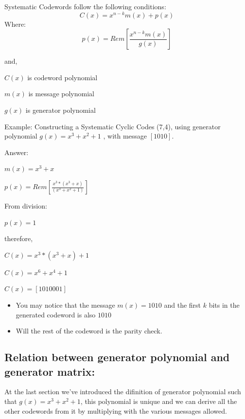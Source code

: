 \documentclass[a4paper,12pt]{report}
\begin{document}
{        Systematic Codewords follow the following conditions:
        \begin{equation*}
            C(x) = x^{n-k} m(x) + p(x)
        \end{equation*}
        Where:
        \begin{equation*}
            p(x) = Rem \left[ \frac{x^{n-k} m(x)}{g(x)} \right]
        \end{equation*}

        and,

        $C(x)$ is codeword polynomial
        
        $m(x)$ is message polynomial
        
        $g(x)$ is generator polynomial

        \vspace{0.5cm}
        Example: Constructing a Systematic Cyclic Codes (7,4), using generator polynomial
        $g(x) = x^3 + x^2 +1$ , with message $[1 0 1 0]$.
        \vspace{0.5cm}
        
        Answer:

        $m(x) = x^3 + x$
        
        $p(x) = Rem \left[ \frac{ x^{3} *\left(x^3 + x\right) }{\left( x^3 + x^2 +1\right)} \right]$

        From division:

        $p(x) = 1$

        therefore,

        $C(x) = x^3 * \left(x^3 + x\right) + 1$
        
        $C(x) = x^6 + x^4 + 1$
        
        $C(x) = \left[1010001\right]$
        
    {\renewcommand\labelitemi{}
    \begin{itemize}
        \item You may notice that the message $m(x) = 1 0 1 0$ and the first $k$ bits in the generated
            codeword is also $1010$
        \item Will the rest of the codeword is the parity check.
    \end{itemize}

        
    \subsection{Relation between generator polynomial and generator matrix:}
        At the last section we've introduced the difinition of generator polynomial
        such that $g(x) =x^3 + x^2 +1 $, this polynomial is unique and we can derive all the other
        codewords from it by multiplying with the various messages allowed.

}}
\end{document}
